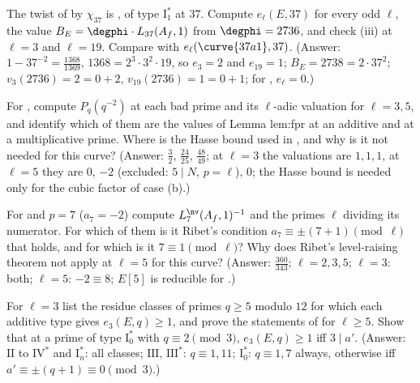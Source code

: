 \begin{exercise}\label{ex:lfunctions:ex-1369}
The twist of  by $\chi_{37}$ is , of type $\mathrm I_1^*$ at $37$. Compute $e_\ell(E,37)$ for every odd $\ell$, the value $B_E=\degphi\cdot L_{37}(A_f,1)$ from
$\degphi=2736$, and check (iii) at $\ell=3$ and $\ell=19$. Compare with $e_\ell(\curve{37a1},37)$. (Answer: $1-37^{-2}=\frac{1368}{1369}$, $1368=2^3\cdot3^2\cdot19$,
so $e_3=2$ and $e_{19}=1$; $B_E=2738=2\cdot37^2$; $v_3(2736)=2=0+2$, $v_{19}(2736)=1=0+1$; for , $e_\ell=0$.)
\end{exercise}

\begin{exercise}\label{ex:lfunctions:ex-980}
For , compute $P_q(q^{-2})$ at each bad prime and its $\ell$-adic valuation for $\ell=3,5$, and identify which of them are the values of Lemma lem:fpr at an additive and at a
multiplicative prime. Where is the Hasse bound used in , and why is it not needed for this curve? (Answer: $\frac32$, $\frac{24}{25}$, $\frac{48}{49}$; at
$\ell=3$ the valuations are $1,1,1$, at $\ell=5$ they are $0$, $-2$ (excluded: $5\mid N$, $p=\ell$), $0$; the Hasse bound is needed only for the cubic factor of case (b).)
\end{exercise}

\begin{exercise}\label{ex:lfunctions:ex-wiles}
For  and $p=7$ ($a_7=-2$) compute $L_7^{\nv}(A_f,1)^{-1}$ and the primes $\ell$ dividing its numerator. For which of them is it Ribet's condition $a_7\equiv\pm(7+1)\pmod\ell$
that holds, and for which is it $7\equiv1\pmod\ell$? Why does Ribet's level-raising theorem not apply at $\ell=5$ for this curve? (Answer: $\frac{360}{343}$; $\ell=2,3,5$; $\ell=3$:
both; $\ell=5$: $-2\equiv8$; $E[5]$ is reducible for .)
\end{exercise}

\begin{exercise}\label{ex:lfunctions:ex-residues}
For $\ell=3$ list the residue classes of primes $q\ge5$ modulo $12$ for which each additive type gives $e_3(E,q)\ge1$, and prove the statements of 
for $\ell\ge5$. Show that at a prime of type $\mathrm I_0^*$ with $q\equiv2\pmod3$, $e_3(E,q)\ge1$ iff $3\mid a'$. (Answer: $\mathrm{II}$ to $\mathrm{IV}^*$ and $\mathrm I_n^*$: all classes; $\mathrm{III}$, $\mathrm{III}^*$:
$q\equiv1,11$; $\mathrm I_0^*$: $q\equiv1,7$ always, otherwise iff $a'\equiv\pm(q+1)\equiv0\pmod3$.)
\end{exercise}


